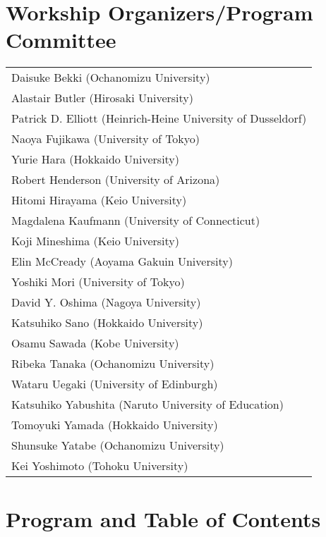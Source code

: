 \documentclass[12pt]{jarticle}
\begin{document}
\section*{Workship Organizers/Program Committee}
\begin{flushleft}
\begin{tabular}{l}
Daisuke Bekki (Ochanomizu University) \\
Alastair Butler (Hirosaki University) \\
Patrick D. Elliott (Heinrich-Heine University of Dusseldorf) \\
Naoya Fujikawa (University of Tokyo) \\
Yurie Hara (Hokkaido University) \\
Robert Henderson (University of Arizona) \\
Hitomi Hirayama (Keio University) \\
Magdalena Kaufmann (University of Connecticut) \\
Koji Mineshima (Keio University) \\
Elin McCready (Aoyama Gakuin University) \\
Yoshiki Mori (University of Tokyo) \\
David Y. Oshima (Nagoya University) \\
Katsuhiko Sano (Hokkaido University) \\
Osamu Sawada (Kobe University) \\
Ribeka Tanaka (Ochanomizu University) \\
Wataru Uegaki (University of Edinburgh) \\
Katsuhiko Yabushita (Naruto University of Education) \\
Tomoyuki Yamada (Hokkaido University) \\
Shunsuke Yatabe (Ochanomizu University) \\
Kei Yoshimoto (Tohoku University) \\

\end{tabular}
\end{flushleft}
\newpage
  
\section*{Program and Table of Contents}

\newcommand{\slot}[2]{\noindent \underline{#1 \  #2} \\}
\newcommand{\talk}[3]{
  \noindent #2 \\ 
  \indent\indent \textit{#1} \dotfill #3 
  \smallskip \\
  }
\newcommand{\talkk}[3]{
  \noindent #2 \\ 
  \indent\indent \textit{#1}
  \smallskip \\
  }
\end{document}
